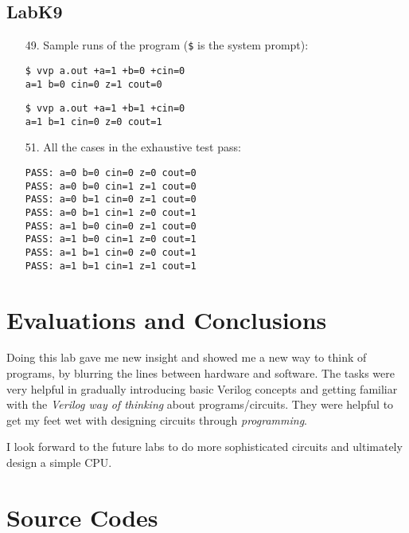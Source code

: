 \documentclass{article}
\begin{document}
\subsection{LabK9}
\begin{enumerate}
\item[49. ] Sample runs of the program (\verb#$# is the system prompt):

\begin{verbatim}
$ vvp a.out +a=1 +b=0 +cin=0
a=1 b=0 cin=0 z=1 cout=0
\end{verbatim}

\begin{verbatim}
$ vvp a.out +a=1 +b=1 +cin=0
a=1 b=1 cin=0 z=0 cout=1
\end{verbatim}

\item[51. ] All the cases in the exhaustive test pass:
\begin{verbatim}
PASS: a=0 b=0 cin=0 z=0 cout=0
PASS: a=0 b=0 cin=1 z=1 cout=0
PASS: a=0 b=1 cin=0 z=1 cout=0
PASS: a=0 b=1 cin=1 z=0 cout=1
PASS: a=1 b=0 cin=0 z=1 cout=0
PASS: a=1 b=0 cin=1 z=0 cout=1
PASS: a=1 b=1 cin=0 z=0 cout=1
PASS: a=1 b=1 cin=1 z=1 cout=1
\end{verbatim}
\end{enumerate}



\section{Evaluations and Conclusions}
Doing this lab gave me new insight and showed me a new way to think of programs, by blurring the lines between hardware and software. The tasks were very helpful in gradually introducing basic Verilog concepts and getting familiar with the \textit{Verilog way of thinking} about programs/circuits. They were helpful to get my feet wet with designing circuits through \textit{programming}.

I look forward to the future labs to do more sophisticated circuits and ultimately design a simple CPU.


\section{Source Codes}
\end{document}

